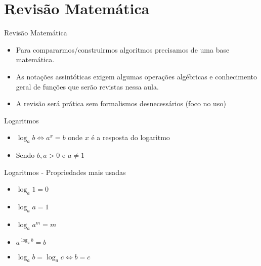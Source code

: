 \section*{Revisão Matemática}

\begin{frame}
	\begin{block}{Revisão Matemática}
		\begin{itemize}
			\item Para compararmos/construirmos algoritmos precisamos de uma base matemática.
			\item As notações assintóticas exigem algumas operações algébricas e conhecimento geral de funções  que serão revistas nessa aula.
			\item A revisão será prática sem formalismos desnecessários (foco no uso)
		\end{itemize}
	\end{block}
\end{frame}

\begin{frame}
	\begin{block}{Logaritmos}
		\begin{itemize}
			\item $\log_a b \Leftrightarrow a^{x} = b $ onde $x$ é a resposta do logaritmo
			\item Sendo $b,a > 0$ e $a \neq 1$
		\end{itemize}
	\end{block}
\end{frame}

\begin{frame}
	\begin{block}{Logaritmos - Propriedades mais usadas}
		\begin{itemize}
			\item $\log_a 1 = 0$
			\item $\log_a a = 1$
			\item $ \log_a a^{m} = m $
			\item $a^{\log_a b} = b$
			\item $\log_a b = \log_a c \Leftrightarrow b = c$
		\end{itemize}
	\end{block}
\end{frame}

